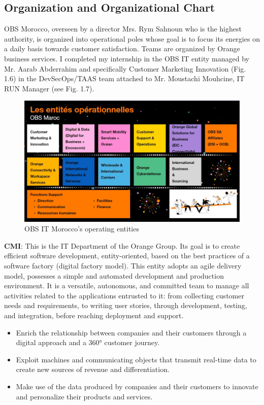 \subsection{Organization and Organizational Chart}
OBS Morocco, overseen by a director Mrs. Rym Sahnoun who is the highest authority, is organized into operational poles whose goal is to focus its energies on a daily basis towards customer satisfaction. Teams are organized by Orange business services. I completed my internship in the OBS IT entity managed by Mr. Aarab Abderrahim and specifically Customer Marketing Innovation (Fig. 1.6) in the DevSecOps/TAAS team attached to Mr. Moustachi Mouhcine, IT RUN Manager (see Fig. 1.7).

\begin{figure}[H]
  \centering
  \includegraphics[width=17.5cm]{Figures/entite.png}
  \caption{OBS IT Morocco's operating entities}
  \label{fig:vue-snoc-pos}
\end{figure}

\textbf{CMI}: This is the IT Department of the Orange Group. Its goal is to create efficient software development, entity-oriented, based on the best practices of a software factory (digital factory model). This entity adopts an agile delivery model, possesses a simple and automated development and production environment. It is a versatile, autonomous, and committed team to manage all activities related to the applications entrusted to it: from collecting customer needs and requirements, to writing user stories, through development, testing, and integration, before reaching deployment and support.

\begin{itemize}
  \item Enrich the relationship between companies and their customers through a digital approach and a 360° customer journey.
  \item Exploit machines and communicating objects that transmit real-time data to create new sources of revenue and differentiation.
  \item Make use of the data produced by companies and their customers to innovate and personalize their products and services.
  \end{itemize}
  
